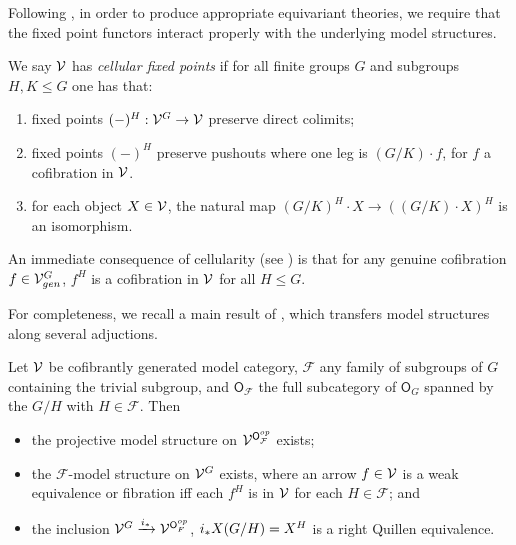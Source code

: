 \documentclass[a4paper,10pt
,draft
]{article}%
\renewcommand{\F}{\mathcal F}
\renewcommand{\1}{\eta}%
\begin{document}
Following \cite{Ste16, BP_geo}, in order to produce appropriate equivariant theories,
we require that the fixed point functors interact properly with the underlying model structures.
\begin{definition}
      \label{CELLFP_DEF}
      We say $\mathcal V$ has \textit{cellular fixed points} if
      for all finite groups $G$ and subgroups $H, K \leq G$ one has that:
      \begin{enumerate}[label = (\roman*)]
      \item fixed points $(-)^H: \mathcal V^G \to \mathcal V$ preserve direct colimits;
      \item fixed points $(-)^H$ preserve pushouts where one leg is $(G/K) \cdot f$, for $f$ a cofibration in $\mathcal V$.
      \item for each object $X \in \mathcal V$, the natural map $(G/K)^H \cdot X \to ((G/K) \cdot X)^H$ is an isomorphism.
      \end{enumerate}
\end{definition}

\begin{remark}
      \label{LEVEL_COF_REM}
      An immediate consequence of cellularity (see \cite[Prop. 6.3(i)]{BP_geo})
      is that for any genuine cofibration $f \in \mathcal V^G_{gen}$,
      $f^H$ is a cofibration in $\mathcal V$ for all $H \leq G$.
\end{remark}


For completeness, we recall a main result of \cite{Ste16}, which transfers model structures along several adjuctions.
\begin{theorem}
      Let $\mathcal V$ be cofibrantly generated model category, $\F$ any family of subgroups of $G$ containing the trivial subgroup, and $\mathsf O_\F$ the full subcategory of $\mathsf O_G$ spanned by the $G/H$ with $H \in \F$.
      Then
      \begin{itemize}
      \item the projective model structure on $\V^{\mathsf O_\F^{op}}$ exists;
      \item the $\F$-model structure on $\mathcal V^G$ exists, where an arrow $f \in \mathcal V$ is a weak equivalence or fibration iff each $f^H$ is in $\mathcal V$ for each $H \in \F$; and
      \item the inclusion $\V^G \xrightarrow{i_{\**}} \V^{\mathsf O_F^{op}}$, $i_{\**}X(G/H) = X^H$ is a right Quillen equivalence.
      \end{itemize}
\end{theorem}      
\end{document}
